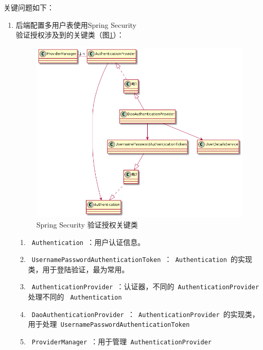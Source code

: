 关键问题如下：
\begin{enumerate}
  \item 后端配置多用户表使用Spring Security\\
        验证授权涉及到的关键类（图\ref{SpringSecurity}）：
        \begin{figure}[htbp]
          \centering
          \includegraphics[scale = 0.5]{out/uml/类图/Spring Security/SpringSecurity验证/SpringSecurity验证.png}
          \caption{\song\wuhao Spring Security 验证授权关键类}
          \label{SpringSecurity}
        \end{figure}
        \begin{enumerate}
          \item \lstinline[language = Java]| Authentication |：用户认证信息。
          \item \lstinline[language = Java]| UsernamePasswordAuthenticationToken |：\lstinline[language = Java]| Authentication |的实现类，用于登陆验证，最为常用。
          \item \lstinline[language = Java]| AuthenticationProvider |：认证器，不同的\lstinline[language = Java]| AuthenticationProvider | 处理不同的 \lstinline[language = Java]| Authentication |
          \item \lstinline[language = Java]| DaoAuthenticationProvider |：\lstinline[language = Java]| AuthenticationProvider |的实现类，用于处理\lstinline[language = Java]| UsernamePasswordAuthenticationToken |
          \item \lstinline[language = Java]| ProviderManager |：用于管理\lstinline[language = Java]| AuthenticationProvider |

\end{enumerate}
\end{enumerate}
